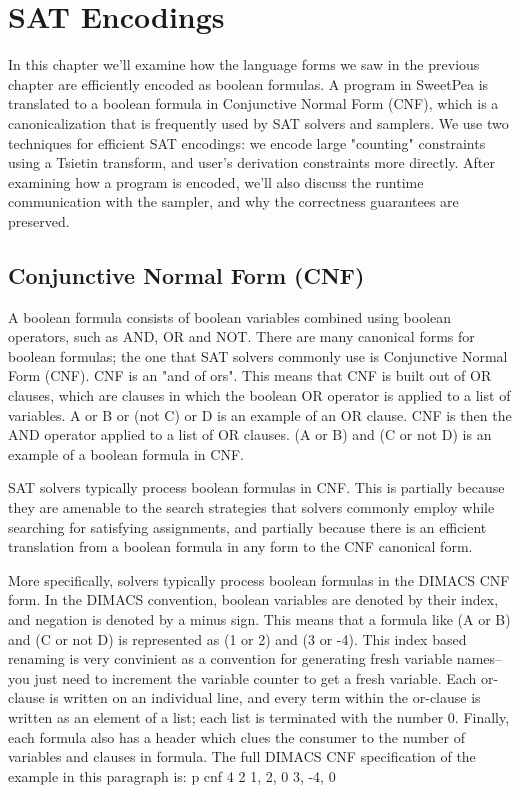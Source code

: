 
\chapter{SAT Encodings}

In this chapter we'll examine how the language forms we saw in the previous chapter are efficiently encoded as boolean formulas. A program in SweetPea is translated to a boolean formula in Conjunctive Normal Form (CNF), which is a canonicalization that is frequently used by SAT solvers and samplers. We use two techniques for efficient SAT encodings: we encode large "counting" constraints using a Tsietin transform, and user's derivation constraints more directly. After examining how a program is encoded, we'll also discuss the runtime communication with the sampler, and why the correctness guarantees are preserved.

\section{Conjunctive Normal Form (CNF)}

A boolean formula consists of boolean variables combined using boolean operators, such as AND, OR and NOT. There are many canonical forms for boolean formulas; the one that SAT solvers commonly use is Conjunctive Normal Form (CNF). CNF is an "and of ors". This means that CNF is built out of OR clauses, which are clauses in which the boolean OR operator is applied to a list of variables. A or B or (not C) or D is an example of an OR clause. CNF is then the AND operator applied to a list of OR clauses. (A or B) and (C or not D) is an example of a boolean formula in CNF.

SAT solvers typically process boolean formulas in CNF. This is partially because they are amenable to the search strategies that solvers commonly employ while searching for satisfying assignments, and partially because there is an efficient translation from a boolean formula in any form to the CNF canonical form.

More specifically, solvers typically process boolean formulas in the DIMACS CNF form. In the DIMACS convention, boolean variables are denoted by their index, and negation is denoted by a minus sign. This means that a formula like (A or B) and (C or not D) is represented as (1 or 2) and (3 or -4). This index based renaming is very convinient as a convention for generating fresh variable names-- you just need to increment the variable counter to get a fresh variable. Each or-clause is written on an individual line, and every term within the or-clause is written as an element of a list; each list is terminated with the number 0. Finally, each formula also has a header which clues the consumer to the number of variables and clauses in formula. The full DIMACS CNF specification of the example in this paragraph is:
p cnf 4 2
1, 2, 0
3, -4, 0


